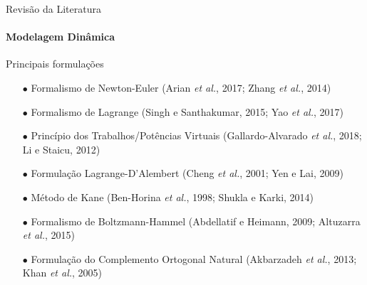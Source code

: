 \documentclass[25pt,landscape]{beamer}
\begin{document}
\begin{frame}{Revisão da Literatura}
    \framesubtitle{Modelagem Dinâmica}
    \begin{block}{Principais formulações}
        \begin{itemize}
            \item[$\bullet$] Formalismo de Newton-Euler (Arian \emph{et al.}, 2017; Zhang \emph{et al.}, 2014) \\[4pt] %
            \item[$\bullet$] Formalismo de Lagrange (Singh e Santhakumar, 2015; Yao \emph{et al.}, 2017) \\[4pt] %
            \item[$\bullet$] Princípio dos Trabalhos/Potências Virtuais (Gallardo-Alvarado \emph{et al.}, 2018; Li e Staicu, 2012) \\[4pt] %
            \item[$\bullet$] Formulação Lagrange-D'Alembert (Cheng \emph{et al.}, 2001; Yen e Lai, 2009) \\[4pt]
            \item[$\bullet$] Método de Kane (Ben-Horina \emph{et al.}, 1998; Shukla e Karki, 2014) \\[4pt]
            \item[$\bullet$] Formalismo de Boltzmann-Hammel (Abdellatif e Heimann, 2009; Altuzarra \emph{et al.}, 2015) \\[4pt]
            \item[$\bullet$] Formulação do Complemento Ortogonal Natural  (Akbarzadeh \emph{et al.}, 2013; Khan \emph{et al.}, 2005) \\[4pt] %
        \end{itemize}
    \end{block}
\end{frame}
\end{document}
